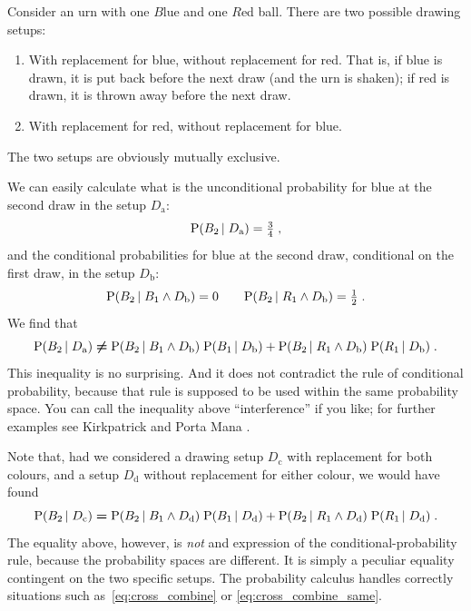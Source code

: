 \documentclass[\ifafour a4paper,12pt,\else a5paper,10pt,\fi%
onecolumn,oneside,article,%
british%
]{memoir}
\theoremstyle{remark}
\theoremstyle{innote}
\newcommand*{\citey}{\parencites*}
\newcommand*{\p}{\mathrm{P}}%
\renewcommand*{\|}[1][]{\nonscript\,#1\vert\nonscript\;\mathopen{}}
\newcommand*{\sect}{\S}%
\newcommand*{\yDa}{D_{\textrm{a}}}
\newcommand*{\yDb}{D_{\textrm{b}}}
\newcommand*{\yDc}{D_{\textrm{c}}}
\newcommand*{\yDd}{D_{\textrm{d}}}
\begin{document}
Consider an urn with one $B$lue and one $R$ed ball. There are two possible
drawing setups:
\begin{enumerate}[label=$D_{\textrm{\alph*}}$]
\item\label{item:repB} With replacement for blue, without replacement for red. That is, if
  blue is drawn, it is put back before the next draw (and the urn is
  shaken); if red is drawn, it is thrown away before the next draw.
\item \label{item:repR} With replacement for red, without replacement for blue.
\end{enumerate}
The two setups are obviously mutually exclusive.

We can easily calculate what is the unconditional probability for blue at
the second draw in the setup $\yDa$:
\begin{equation}
  \label{eq:A_red2}
  \p(B_{2} \| \yDa) = \tfrac{3}{4} \;,
\end{equation}
and the conditional probabilities for blue at the second draw, conditional
on the first draw, in the setup $\yDb$:
\begin{equation}
  \label{eq:A_red2}
  \p(B_{2} \| B_{1} \land \yDb) = 0 \qquad
  \p(B_{2} \| R_{1} \land \yDb) = \tfrac{1}{2} \;.
\end{equation}
We  find that
\begin{equation}
  \label{eq:cross_combine}
  \p(B_{2} \| \yDa) \mathrel{\bm{\ne}}
  \p(B_{2} \| B_{1} \land \yDb) \; \p( B_{1} \| \yDb) +
  \p(B_{2} \| R_{1} \land \yDb)  \; \p( R_{1} \| \yDb) \;.
\end{equation}
This inequality is no surprising. And it does not contradict the rule of
conditional probability, because that rule is supposed to be used within
the same probability space. You can call the inequality above
\enquote{interference} if you like; for further examples see Kirkpatrick
\citey{kirkpatrick2001_r2003,kirkpatrick2002_r2003} and Porta Mana
\citey[\sect~IV]{portamana2003_r2004}.

Note that, had we considered a drawing setup $\yDc$ with replacement for both
colours, and a setup $\yDd$ without replacement for either colour, we would
have found
\begin{equation}
  \label{eq:cross_combine_same}
  \p(B_{2} \| \yDc) \mathrel{\bm{=}}
  \p(B_{2} \| B_{1} \land \yDd) \; \p( B_{1} \| \yDd) +
  \p(B_{2} \| R_{1} \land \yDd)  \; \p( R_{1} \| \yDd) \;.
\end{equation}
The equality above, however, is \emph{not} and expression of the
conditional-probability rule, because the probability spaces are different.
It is simply a peculiar equality contingent on the two specific setups. The
probability calculus handles correctly situations such
as~\eqref{eq:cross_combine} or \eqref{eq:cross_combine_same}.
\end{document}
